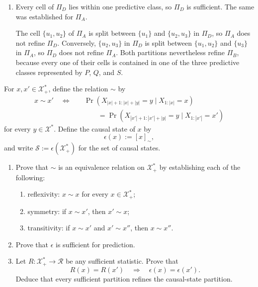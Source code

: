 \documentclass[11pt]{article}
\begin{document}
\begin{solution}[ex:p2-1]
\begin{enumerate}
      \item Every cell of $\Pi_D$ lies within one predictive class, so $\Pi_D$
        is sufficient. The same was established for $\Pi_A$.

        The cell $\{u_1,u_2\}$ of $\Pi_A$ is split between $\{u_1\}$ and
        $\{u_2,u_3\}$ in $\Pi_D$, so $\Pi_A$ does not refine $\Pi_D$.
        Conversely, $\{u_2,u_3\}$ in $\Pi_D$ is split between
        $\{u_1,u_2\}$ and $\{u_3\}$ in $\Pi_A$, so $\Pi_D$ does not refine
        $\Pi_A$. Both partitions nevertheless refine $\Pi_B$, because every
        one of their cells is contained in one of the three predictive classes
        represented by $P$, $Q$, and $S$.
    \end{enumerate}
\end{solution}

\begin{exercise}
\label{ex:p2-2}
  For $x,x'\in\mathcal X_+^*$, define the relation $\sim$ by
  \[
    \begin{aligned}
    x\sim x'
    \quad\Longleftrightarrow\quad
    &\Pr\!\left(
      X_{|x|+1:|x|+|y|}=y\mid X_{1:|x|}=x
    \right)\\
    &\qquad=
    \Pr\!\left(
      X_{|x'|+1:|x'|+|y|}=y\mid X_{1:|x'|}=x'
    \right)
    \end{aligned}
  \]
  for every $y\in\mathcal X^*$. Define the causal state of $x$ by
  \[
    \epsilon(x):=[x]_{\sim},
  \]
  and write $\mathcal S:=\epsilon(\mathcal X_+^*)$ for the set of
  causal states.

  \begin{enumerate}
    \item Prove that $\sim$ is an equivalence relation on
      $\mathcal X_+^*$ by establishing each of the following:
      \begin{enumerate}
        \item reflexivity: $x\sim x$ for every $x\in\mathcal X_+^*$;
        \item symmetry: if $x\sim x'$, then $x'\sim x$;
        \item transitivity: if $x\sim x'$ and $x'\sim x''$, then
          $x\sim x''$.
      \end{enumerate}

    \item Prove that $\epsilon$ is sufficient for prediction.

    \item Let $R:\mathcal X_+^*\to\mathcal R$ be any sufficient statistic.
      Prove that
      \[
        R(x)=R(x')\quad\Longrightarrow\quad
        \epsilon(x)=\epsilon(x').
      \]
      Deduce that every sufficient partition refines the causal-state
      partition.


\end{enumerate}
\end{exercise}
\end{document}
